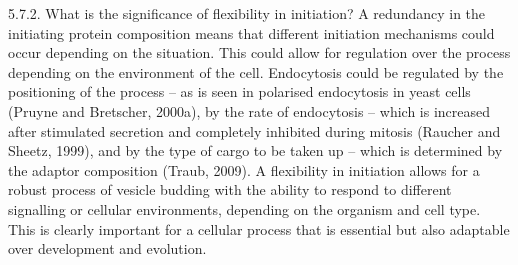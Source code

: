 \vspace{5mm}
5.7.2. What is the significance of flexibility in initiation? 
A redundancy in the initiating protein composition means that different initiation mechanisms could occur depending on the situation. This could allow for regulation over the process depending on the environment of the cell. Endocytosis could be regulated by the positioning of the process – as is seen in polarised endocytosis in yeast cells (Pruyne and Bretscher, 2000a), by the rate of endocytosis – which is increased after stimulated secretion and completely inhibited during mitosis (Raucher and Sheetz, 1999), and by the type of cargo to be taken up – which is determined by the adaptor composition (Traub, 2009). A flexibility in initiation allows for a robust process of vesicle budding with the ability to respond to different signalling or cellular environments, depending on the organism and cell type. This is clearly important for a cellular process that is essential but also adaptable over development and evolution. 
